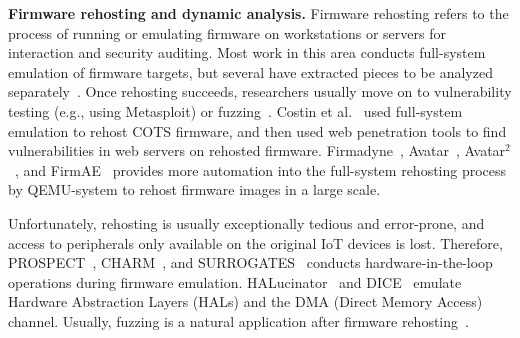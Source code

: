 \medskip
\noindent
\textbf{Firmware rehosting and dynamic analysis.}
Firmware rehosting refers to the process of running or emulating firmware on workstations or servers for interaction and security auditing.
Most work in this area conducts full-system emulation of firmware targets, but several have extracted pieces to be analyzed separately~\cite{redini2017bootstomp,costin2014large}.
Once rehosting succeeds, researchers usually move on to vulnerability testing (e.g., using Metasploit) or fuzzing~\cite{chen2018iotfuzzer,ruge2020frankenstein}.
Costin et al.~\cite{Costin16} used full-system emulation to rehost COTS firmware, and then used web penetration tools to find vulnerabilities in web servers on rehosted firmware.
Firmadyne~\cite{chen2016towards}, Avatar~\cite{AVATAR}, Avatar$^2$~\cite{AVATAR2}, and FirmAE~\cite{kim2020firmae} provides more automation into the full-system rehosting process by QEMU-system to rehost firmware images in a large scale.  

Unfortunately, rehosting is usually exceptionally tedious and error-prone, and access to peripherals only available on the original IoT devices is lost.
Therefore, PROSPECT~\cite{Prospect}, CHARM~\cite{Charm}, and SURROGATES~\cite{Surrogates} conducts hardware-in-the-loop operations during firmware emulation.
HALucinator~\cite{HALucinator} and DICE~\cite{DICE} emulate Hardware Abstraction Layers (HALs) and the DMA (Direct Memory Access) channel.
Usually, fuzzing is a natural application after firmware rehosting~\cite{zheng2019firm,zheng2022efficient,srivastava2019firmfuzz,feng2021snipuzz}.


% 
